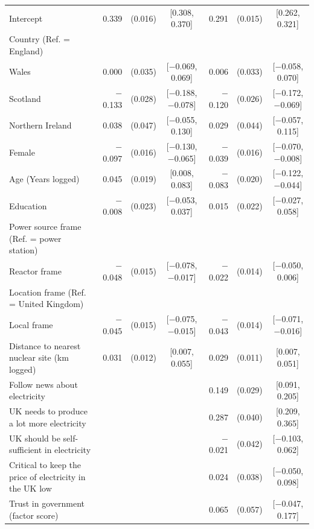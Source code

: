 \begin{landscape}
\begin{longtable}[t]{>{\raggedright\arraybackslash}p{2.8in}rrcrrc}
\endfoot
\bottomrule
\endlastfoot
Intercept & 0.339 & (0.016) & {}[0.308, 0.370] & 0.291 & (0.015) & {}[0.262, 0.321]\\
Country (Ref. = England) &  &  &  &  &  & \\
\hspace{1em}Wales & 0.000 & (0.035) & {}[$-$0.069, 0.069] & 0.006 & (0.033) & {}[$-$0.058, 0.070]\\
\hspace{1em}Scotland & $-$0.133 & (0.028) & {}[$-$0.188, $-$0.078] & $-$0.120 & (0.026) & {}[$-$0.172, $-$0.069]\\
\hspace{1em}Northern Ireland & 0.038 & (0.047) & {}[$-$0.055, 0.130] & 0.029 & (0.044) & {}[$-$0.057, 0.115]\\
Female & $-$0.097 & (0.016) & {}[$-$0.130, $-$0.065] & $-$0.039 & (0.016) & {}[$-$0.070, $-$0.008]\\
Age (Years logged) & 0.045 & (0.019) & {}[0.008, 0.083] & $-$0.083 & (0.020) & {}[$-$0.122, $-$0.044]\\
Education & $-$0.008 & (0.023) & {}[$-$0.053, 0.037] & 0.015 & (0.022) & {}[$-$0.027, 0.058]\\
Power source frame (Ref. = power station) &  &  &  &  &  & \\
\hspace{1em}Reactor frame & $-$0.048 & (0.015) & {}[$-$0.078, $-$0.017] & $-$0.022 & (0.014) & {}[$-$0.050, 0.006]\\
Location frame (Ref. = United Kingdom) &  &  &  &  &  & \\
\hspace{1em}Local frame & $-$0.045 & (0.015) & {}[$-$0.075, $-$0.015] & $-$0.043 & (0.014) & {}[$-$0.071, $-$0.016]\\
Distance to nearest nuclear site (km logged) & 0.031 & (0.012) & {}[0.007, 0.055] & 0.029 & (0.011) & {}[0.007, 0.051]\\
Follow news about electricity &  &  &  & 0.149 & (0.029) & {}[0.091, 0.205]\\
UK needs to produce a lot more electricity &  &  &  & 0.287 & (0.040) & {}[0.209, 0.365]\\
UK should be self-sufficient in electricity &  &  &  & $-$0.021 & (0.042) & {}[$-$0.103, 0.062]\\
Critical to keep the price of electricity in the UK low &  &  &  & 0.024 & (0.038) & {}[$-$0.050, 0.098]\\
Trust in government (factor score) &  &  &  & 0.065 & (0.057) & {}[$-$0.047, 0.177]\\

\end{longtable}
\end{landscape}
